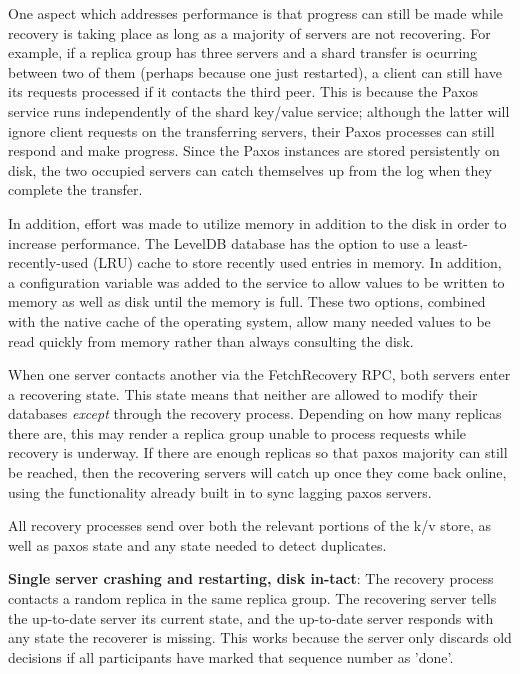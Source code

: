 \documentclass[letterpaper,10pt]{article}
\begin{document}
One aspect which addresses performance is that progress can still be made while recovery is taking place as long as a majority of servers are not recovering.  For example, if a replica group has three servers and a shard transfer is ocurring between two of them (perhaps because one just restarted), a client can still have its requests processed if it contacts the third peer.  This is because the Paxos service runs independently of the shard key/value service; although the latter will ignore client requests on the transferring servers, their Paxos processes can still respond and make progress.  Since the Paxos instances are stored persistently on disk, the two occupied servers can catch themselves up from the log when they complete the transfer.

In addition, effort was made to utilize memory in addition to the disk in order to increase performance.  The LevelDB database has the option to use a least-recently-used (LRU) cache to store recently used entries in memory.  In addition, a configuration variable was added to the service to allow values to be written to memory as well as disk until the memory is full.  These two options, combined with the native cache of the operating system, allow many needed values to be read quickly from memory rather than always consulting the disk.

When one server contacts another via the FetchRecovery RPC, both
servers enter a recovering state. This state means that neither are
allowed to modify their databases \emph{except} through the recovery
process. Depending on how many replicas there are, this may render a
replica group unable to process requests while recovery is underway.
If there are enough replicas so that paxos majority can still be
reached, then the recovering servers will catch up once they come back
online, using the functionality already built in to sync lagging paxos
servers.

All recovery processes send over both the relevant portions of the k/v
store, as well as paxos state and any state needed to detect
duplicates.

\textbf{Single server crashing and restarting, disk in-tact}: The
recovery process contacts a random replica in the same replica group.
The recovering server tells the up-to-date server its current state,
and the up-to-date server responds with any state the recoverer is
missing. This works because the server only discards old decisions if
all participants have marked that sequence number as 'done'.
\end{document}
